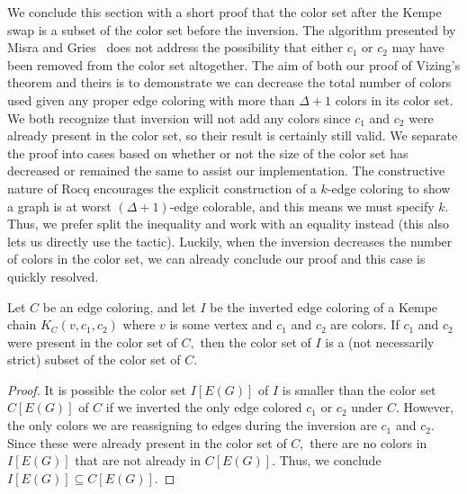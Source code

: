We conclude this section with a short proof that the color set after the Kempe swap is a subset of the color set before the inversion. The algorithm presented by Misra and Gries~\cite{Misra} does not address the possibility that either $c_1$ or $c_2$ may have been removed from the color set altogether. The aim of both our proof of Vizing's theorem and theirs is to demonstrate we can decrease the total number of colors used given any proper edge coloring with more than $\Delta + 1$ colors in its color set. We both recognize that inversion will not add any colors since $c_1$ and $c_2$ were already present in the color set, so their result is certainly still valid. We separate the proof into cases based on whether or not the size of the color set has decreased or remained the same to assist our implementation. The constructive nature of Rocq encourages the explicit construction of a $k$-edge coloring to show a graph is at worst $(\Delta + 1)$-edge colorable, and this means we must specify $k.$ Thus, we prefer split the inequality and work with an equality instead (this also lets us directly use the  tactic). Luckily, when the inversion decreases the number of colors in the color set, we can already conclude our proof and this case is quickly resolved.
\begin{lemma}\label{imset_invert_sub}
   Let $C$ be an edge coloring, and let $I$ be the inverted edge coloring of a Kempe chain $K_C(v, c_1, c_2)$ where $v$ is some vertex and $c_1$ and $c_2$ are colors. If $c_1$ and $c_2$ were present in the color set of $C,$ then the color set of $I$ is a (not necessarily strict) subset of the color set of $C.$
\end{lemma}
\begin{proof}
    It is possible the color set $I[E(G)]$ of $I$ is smaller than the color set $C[E(G)]$ of $C$ if we inverted the only edge colored $c_1$ or $c_2$ under $C.$ However, the only colors we are reassigning to edges during the inversion are $c_1$ and $c_2.$ Since these were already present in the color set of $C,$ there are no colors in $I[E(G)]$ that are not already in $C[E(G)].$ Thus, we conclude $I[E(G)] \subseteq C[E(G)].$
\end{proof}

